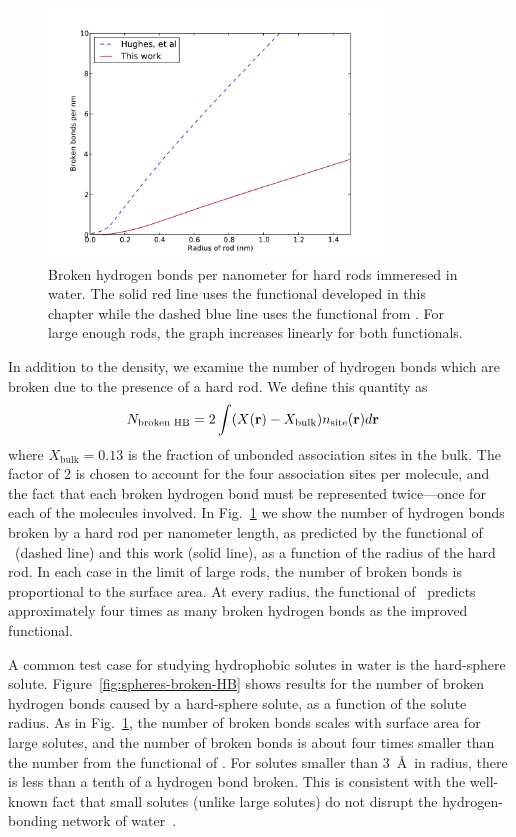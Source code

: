 \begin{figure}
\begin{center}
\includegraphics[width=3.5in]{figs/single-rod-broken-HB}
\end{center}
\caption{Broken hydrogen bonds per nanometer for hard rods
  immeresed in water.  The solid red line uses the functional developed
  in this chapter while the dashed blue line uses the functional from
  \hughesetal. For large enough rods, the graph
  increases linearly for both functionals.}
\label{fig:single-rod-broken-HB}
\end{figure}

In addition to the density, we examine the number of hydrogen bonds
which are broken due to the presence of a hard rod.  We define this
quantity as
\begin{align}
  N_{\text{broken HB}} &= 2 \int (X(\textbf{r}) - X_{\text{bulk}})n_{\text{site}}(\textbf{r}) d\textbf{r}
\end{align}
where $X_{\text{bulk}} = 0.13$ is the fraction of unbonded
association sites in the bulk.  The factor of 2 is chosen to account
for the four association sites per molecule, and the fact that each
broken hydrogen bond must be represented twice---once for each of the
molecules involved.  In Fig.~\ref{fig:single-rod-broken-HB} we show
the number of hydrogen bonds broken by a hard rod per nanometer
length, as predicted by the functional of \hughesetal\ (dashed line)
and this work (solid line), as a function of the radius of the hard
rod.  In each case in the limit of large rods, the number of broken
bonds is proportional to the surface area.  At every radius, the
functional of \hughesetal\ predicts approximately four times as many
broken hydrogen bonds as the improved functional.

A common test case for studying hydrophobic solutes in water is the
hard-sphere solute.  Figure~\ref{fig:spheres-broken-HB} shows results
for the number of broken hydrogen bonds caused by a hard-sphere solute,
as a function of the solute radius.  As in
Fig.~\ref{fig:single-rod-broken-HB}, the number of broken bonds scales
with surface area for large solutes, and the number of broken bonds is
about four times smaller than the number from the functional of
\hughesetal.  For solutes smaller than
3~\AA\ in radius, there is less than a tenth of a hydrogen bond
broken. This is consistent with the well-known fact that small solutes
(unlike large solutes) do not disrupt the hydrogen-bonding network of
water~\cite{chandler2005}.

